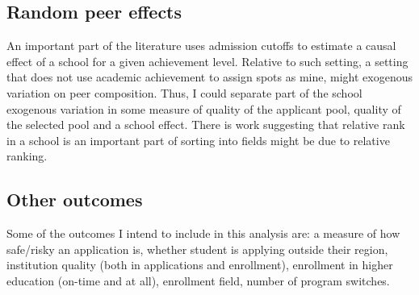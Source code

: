 \documentclass[12pt]{article}
\begin{document}




\subsection{Random peer effects}

An important part of the literature uses admission cutoffs to estimate a causal effect of a school for a given achievement level. Relative to such setting, a setting that does not use academic achievement to assign spots as mine, might exogenous variation on peer composition. Thus, I could separate part of the school exogenous variation in some measure of quality of the applicant pool, quality of the selected pool and a school effect. There is work suggesting that relative rank in a school is an important part of sorting into fields might be due to relative ranking. \parencite{goulas_comparative_2024, delaney_high_2021}

\subsection{Other outcomes}

Some of the outcomes I intend to include in this analysis are: a measure of how safe/risky an application is, whether student is applying outside their region,  institution quality (both in applications and enrollment), enrollment in higher education (on-time and at all), enrollment field, number of program switches. 
\end{document}
